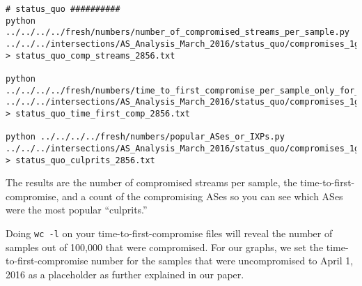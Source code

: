 \documentclass{article}
\begin{document}
\begin{lstlisting}
# status_quo ##########
python ../../../../fresh/numbers/number_of_compromised_streams_per_sample.py 
../../../intersections/AS_Analysis_March_2016/status_quo/compromises_1guard_100K_2856.pickle 
> status_quo_comp_streams_2856.txt

python ../../../../fresh/numbers/time_to_first_compromise_per_sample_only_for_comp.py 
../../../intersections/AS_Analysis_March_2016/status_quo/compromises_1guard_100K_2856.pickle 
> status_quo_time_first_comp_2856.txt

python ../../../../fresh/numbers/popular_ASes_or_IXPs.py 
../../../intersections/AS_Analysis_March_2016/status_quo/compromises_1guard_100K_2856.pickle 
> status_quo_culprits_2856.txt
\end{lstlisting}

The results are 
the number of compromised streams per sample, the time-to-first-compromise, and a count 
of the compromising ASes so you can see which ASes were the most popular ``culprits.'' 

Doing {\tt wc -l} on your time-to-first-compromise files will reveal the number 
of samples out of 100,000 that were compromised. For our graphs, we set the 
time-to-first-compromise number for the samples that were uncompromised to 
April 1, 2016 as a placeholder as further explained in our paper.

\printbibliography
\end{document}
